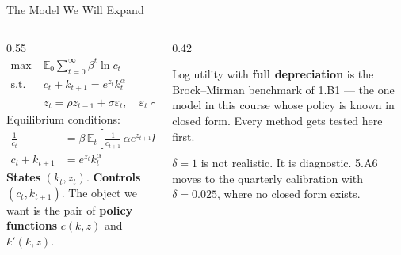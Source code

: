 \begin{frame}{The Model We Will Expand}
\begin{columns}[T]
\begin{column}{0.55\textwidth}
\small
\vspace{-2mm}
\begin{align*}
\max\;&\mathbb{E}_{0}\sum_{t=0}^{\infty}\beta^{t}\ln c_{t}\\
\text{s.t.}\;\; & c_{t}+k_{t+1}=e^{z_{t}}k_{t}^{\alpha}\\
 & z_{t}=\rho z_{t-1}+\sigma\varepsilon_{t},\quad \varepsilon_t\sim N(0,1)
\end{align*}
Equilibrium conditions:
\begin{align*}
\frac{1}{c_{t}} &=\beta\,\mathbb{E}_{t}\!\left[\frac{1}{c_{t+1}}\,\alpha e^{z_{t+1}}k_{t+1}^{\alpha-1}\right]\\
c_{t}+k_{t+1} &= e^{z_{t}}k_{t}^{\alpha}
\end{align*}
\textbf{States} $(k_t,z_t)$. \textbf{Controls} $(c_t,k_{t+1})$. The object we want is the pair of \textbf{policy functions} $c(k,z)$ and $k'(k,z)$.
\end{column}
\begin{column}{0.42\textwidth}
\begin{conceptbox}[title=\textbf{Why this model}]\small
Log utility with \textbf{full depreciation} is the Brock--Mirman benchmark of 1.B1 --- the one model in this course whose policy is known in closed form. Every method gets tested here first.
\end{conceptbox}
\medskip
\begin{examplebox}\footnotesize
$\delta=1$ is not realistic. It is diagnostic. 5.A6 moves to the quarterly calibration with $\delta=0.025$, where no closed form exists.
\end{examplebox}
\end{column}
\end{columns}
\vspace{1mm}
\end{frame}

